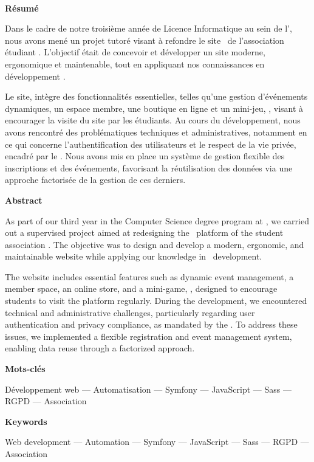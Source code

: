 \pagebreak
\thispagestyle{empty}
~
\bigskip
\bigskip
\bigskip
\bigskip

\Large{\textbf{Résumé}}\normalsize
\label{chap:abstract-fr}
\bigskip

Dans le cadre de notre troisième année de Licence Informatique au sein de l’\univ, nous avons mené un projet tutoré visant à refondre le site \web\ de l’association étudiant . L’objectif était de concevoir et développer un site moderne, ergonomique et maintenable, tout en appliquant nos connaissances en développement \web.

Le site, intègre des fonctionnalités essentielles, telles qu’une gestion d’événements dynamiques, un espace membre, une boutique en ligne et un mini-jeu, \game, visant à encourager la visite du site par les étudiants. Au cours du développement, nous avons rencontré des problématiques techniques et administratives, notamment en ce qui concerne l’authentification des utilisateurs et le respect de la vie privée, encadré par le . Nous avons mis en place un système de gestion flexible des inscriptions et des événements, favorisant la réutilisation des données via une approche factorisée de la gestion de ces derniers.
\bigskip
\bigskip


\Large{\textbf{Abstract}}\normalsize
\label{chap:abstract-en}
\bigskip

As part of our third year in the Computer Science degree program at \univ, we carried out a supervised project aimed at redesigning the \web\ platform of the student association . The objective was to design and develop a modern, ergonomic, and maintainable website while applying our knowledge in \web\ development.

The website includes essential features such as dynamic event management, a member space, an online store, and a mini-game, \game, designed to encourage students to visit the platform regularly. During the development, we encountered technical and administrative challenges, particularly regarding user authentication and privacy compliance, as mandated by the . To address these issues, we implemented a flexible registration and event management system, enabling data reuse through a factorized approach.
\bigskip
\bigskip


\large{\textbf{Mots-clés}}\normalsize
\bigskip


\noindent Développement web --- Automatisation --- Symfony --- JavaScript --- Sass --- RGPD --- Association
\bigskip
\bigskip

\large{\textbf{Keywords}}\normalsize
\bigskip



\noindent Web development --- Automation --- Symfony --- JavaScript --- Sass --- RGPD --- Association
